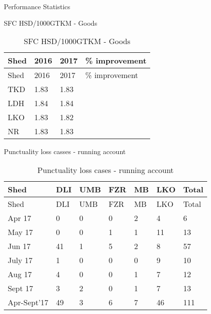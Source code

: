 \documentclass[
  ignorenonframetext,
]{beamer}
\begin{document}
\begin{frame}{Performance Statistics}
\begin{block}{SFC HSD/1000GTKM - Goods}
\protect\hypertarget{sfc-hsd1000gtkm---goods}{}
\begin{longtable}[]{@{}llll@{}}
\caption{SFC HSD/1000GTKM - Goods}\tabularnewline
\toprule()
Shed & 2016 & 2017 & \% improvement \\
\midrule()
\endfirsthead
\toprule()
Shed & 2016 & 2017 & \% improvement \\
\midrule()
\endhead
TKD & 1.83 & 1.83 & \\
LDH & 1.84 & 1.84 & \\
LKO & 1.83 & 1.82 & \\
NR & 1.83 & 1.83 & \\
\bottomrule()
\end{longtable}

\begin{block}{Punctuality loss casses - running account}
\protect\hypertarget{punctuality-loss-casses---running-account}{}
\begin{longtable}[]{@{}lllllll@{}}
\caption{Punctuality loss cases - running account}\tabularnewline
\toprule()
Shed & DLI & UMB & FZR & MB & LKO & Total \\
\midrule()
\endfirsthead
\toprule()
Shed & DLI & UMB & FZR & MB & LKO & Total \\
\midrule()
\endhead
Apr 17 & 0 & 0 & 0 & 2 & 4 & 6 \\
May 17 & 0 & 0 & 1 & 1 & 11 & 13 \\
Jun 17 & 41 & 1 & 5 & 2 & 8 & 57 \\
July 17 & 1 & 0 & 0 & 0 & 9 & 10 \\
Aug 17 & 4 & 0 & 0 & 1 & 7 & 12 \\
Sept 17 & 3 & 2 & 0 & 1 & 7 & 13 \\
Apr-Sept'17 & 49 & 3 & 6 & 7 & 46 & 111 \\
\bottomrule()
\end{longtable}
\end{block}
\end{block}
\end{frame}
\end{document}
